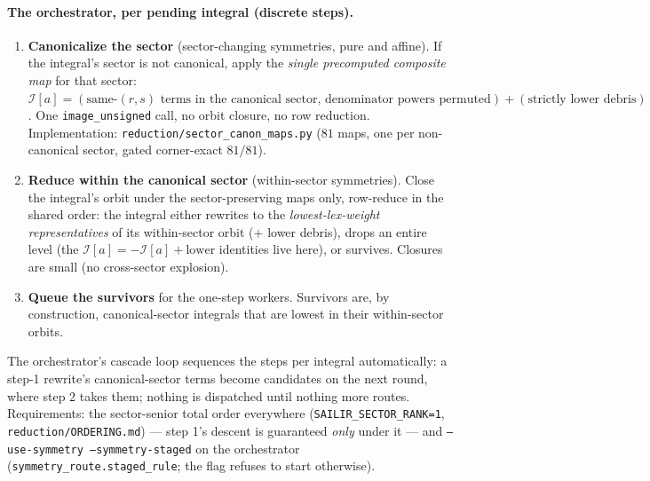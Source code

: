 \documentclass[11pt]{article}
\newcommand{\I}[1]{\mathcal{I}[#1]}
\newcommand{\code}[1]{\texttt{#1}}
\begin{document}
\paragraph{The orchestrator, per pending integral (discrete steps).}
\begin{enumerate}
\item \textbf{Canonicalize the sector} (sector-changing symmetries, pure and affine).
      If the integral's sector is not canonical, apply the \emph{single precomputed
      composite map} for that sector: $\I{a} = (\text{same-}(r,s)\text{ terms in the
      canonical sector, denominator powers permuted}) + (\text{strictly lower
      debris})$. One \code{image\_unsigned} call, no orbit closure, no row reduction.
      Implementation: \code{reduction/sector\_canon\_maps.py} ($81$ maps, one per
      non-canonical sector, gated corner-exact $81/81$).
\item \textbf{Reduce within the canonical sector} (within-sector symmetries). Close
      the integral's orbit under the sector-preserving maps only, row-reduce in the
      shared order: the integral either rewrites to the \emph{lowest-lex-weight
      representatives} of its within-sector orbit ($+$ lower debris), drops an entire
      level (the $\I{a}=-\I{a}+\text{lower}$ identities live here), or survives.
      Closures are small (no cross-sector explosion).
\item \textbf{Queue the survivors} for the one-step workers. Survivors are, by
      construction, canonical-sector integrals that are lowest in their within-sector
      orbits.
\end{enumerate}
The orchestrator's cascade loop sequences the steps per integral automatically: a
step-1 rewrite's canonical-sector terms become candidates on the next round, where
step 2 takes them; nothing is dispatched until nothing more routes. Requirements: the
sector-senior total order everywhere (\code{SAILIR\_SECTOR\_RANK=1},
\code{reduction/ORDERING.md}) --- step 1's descent is guaranteed \emph{only} under it
--- and \code{--use-symmetry --symmetry-staged} on the orchestrator
(\code{symmetry\_route.staged\_rule}; the flag refuses to start otherwise).
\end{document}
